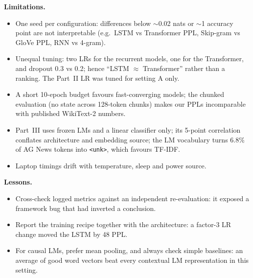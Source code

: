 \documentclass[10pt,a4paper]{article}
\begin{document}
\textbf{Limitations.}
\begin{itemize}
\item One seed per configuration: differences below $\sim$0.02 nats or $\sim$1 accuracy point are not
  interpretable (e.g.\ LSTM vs Transformer PPL, Skip-gram vs GloVe PPL, RNN vs 4-gram).
\item Unequal tuning: two LRs for the recurrent models, one for the Transformer, and dropout 0.3 vs 0.2; hence
  ``LSTM $\approx$ Transformer'' rather than a ranking. The Part~II LR was tuned for setting A only.
\item A short 10-epoch budget favours fast-converging models; the chunked evaluation (no state across 128-token
  chunks) makes our PPLs incomparable with published WikiText-2 numbers.
\item Part~III uses frozen LMs and a linear classifier only; its 5-point correlation conflates architecture and
  embedding source; the LM vocabulary turns 6.8\% of AG News tokens into \texttt{<unk>}, which favours TF-IDF.
\item Laptop timings drift with temperature, sleep and power source.
\end{itemize}
\textbf{Lessons.}
\begin{itemize}
\item Cross-check logged metrics against an independent re-evaluation: it exposed a framework bug that had
  inverted a conclusion.
\item Report the training recipe together with the architecture: a factor-3 LR change moved the LSTM by 48 PPL.
\item For causal LMs, prefer mean pooling, and always check simple baselines: an average of good word vectors beat
  every contextual LM representation in this setting.
\end{itemize}
\end{document}
